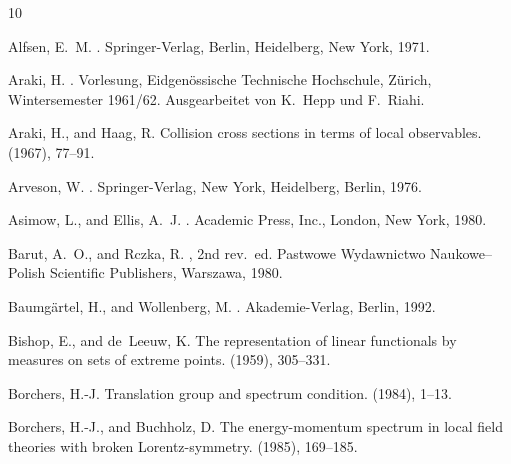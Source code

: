 \documentclass[11pt,twoside,openright]{report}
\theoremstyle{definition}
\theoremstyle{plain}
\theoremstyle{remark}
\theoremstyle{assumption}
\begin{document}
\cleardoublepage



% 
% 

\providecommand{\SortNoop}[1]{}
\begin{thebibliography}{10}

{\sc Alfsen, E.~M.}
.
\newblock Springer-Verlag, Berlin, Heidelberg, New York, 1971.

{\sc Araki, H.}
.
\newblock Vorlesung, Eidgen\"{o}ssische Technische Hochschule, Z\"{u}rich,
  \SortNoop{61}Wintersemester 1961/62.
\newblock Ausgearbeitet von K.~Hepp und F.~Riahi.

{\sc Araki, H., and Haag, R.}
\newblock Collision cross sections in terms of local observables.
 (1967), 77--91.

{\sc Arveson, W.}
.
\newblock Springer-Verlag, New York, Heidelberg, Berlin, 1976.

{\sc Asimow, L., and Ellis, A.~J.}
.
\newblock Academic Press, Inc., London, New York, 1980.

{\sc Barut, A.~O., and Rczka, R.}
, 2nd rev.~ed.
\newblock Pastwowe Wydawnictwo Naukowe--Polish Scientific
  Publishers, Warszawa, 1980.

{\sc Baumg\"artel, H., and Wollenberg, M.}
.
\newblock Akademie-Verlag, Berlin, 1992.

{\sc Bishop, E., and de~Leeuw, K.}
\newblock The representation of linear functionals by measures on sets of
  extreme points.
 (1959), 305--331.

{\sc Borchers, H.-J.}
\newblock Translation group and spectrum condition.
 (1984), 1--13.

{\sc Borchers, H.-J., and Buchholz, D.}
\newblock The energy-momentum spectrum in local field theories with broken
  {Lorentz}-symmetry.
 (1985), 169--185.


\end{thebibliography}
\end{document}
